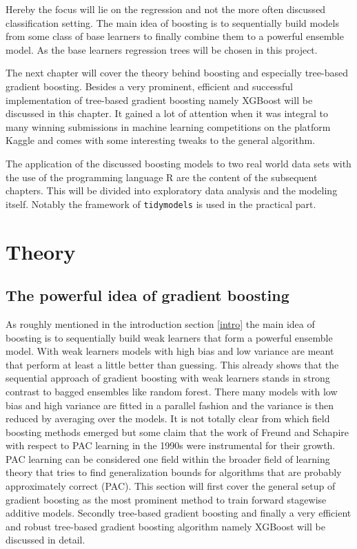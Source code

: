 \documentclass[
]{book}
\begin{document}
Hereby the focus will lie on the regression and not the more often discussed classification setting. The main idea of boosting is to sequentially build models from some class of base learners to finally combine them to a powerful ensemble model. As the base learners regression trees will be chosen in this project.

The next chapter will cover the theory behind boosting and especially tree-based gradient boosting. Besides a very prominent, efficient and successful implementation of tree-based gradient boosting namely XGBoost will be discussed in this chapter. It gained a lot of attention when it was integral to many winning submissions in machine learning competitions on the platform Kaggle and comes with some interesting tweaks to the general algorithm.

The application of the discussed boosting models to two real world data sets with the use of the programming language R are the content of the subsequent chapters. This will be divided into exploratory data analysis and the modeling itself. Notably the framework of \texttt{tidymodels} is used in the practical part.

\hypertarget{theory}{%
\chapter{Theory}\label{theory}}

\hypertarget{the-powerful-idea-of-gradient-boosting}{%
\section{The powerful idea of gradient boosting}\label{the-powerful-idea-of-gradient-boosting}}

As roughly mentioned in the introduction section \ref{intro} the main idea of boosting is to sequentially build weak learners that form a powerful ensemble model. With weak learners models with high bias and low variance are meant that perform at least a little better than guessing. This already shows that the sequential approach of gradient boosting with weak learners stands in strong contrast to bagged ensembles like random forest. There many models with low bias and high variance are fitted in a parallel fashion and the variance is then reduced by averaging over the models.\citep{HandsOnMLwithR} It is not totally clear from which field boosting methods emerged but some claim that the work of Freund and Schapire with respect to PAC learning in the 1990s were instrumental for their growth.\citep{elements} PAC learning can be considered one field within the broader field of learning theory that tries to find generalization bounds for algorithms that are probably approximately correct (PAC).\citep{pacbounds} This section will first cover the general setup of gradient boosting as the most prominent method to train forward stagewise additive models. Secondly tree-based gradient boosting and finally a very efficient and robust tree-based gradient boosting algorithm namely XGBoost will be discussed in detail.
\end{document}
